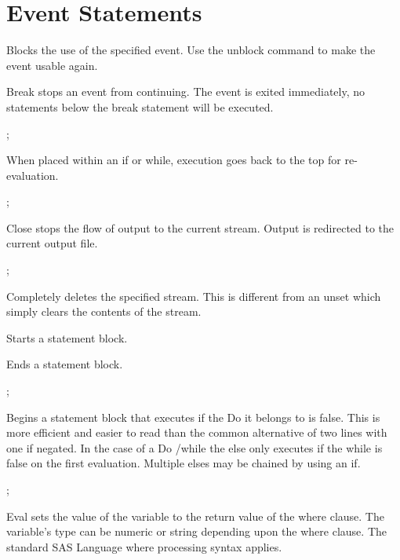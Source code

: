\section{Event Statements}
\begin{description}


Blocks the use of the specified event.  Use the unblock command to
make the event usable again.


Break stops an event from continuing. The event is exited immediately, no statements below
the break statement will be executed.

;

When placed within an if or while, execution goes back to the top for re-evaluation.

;

Close stops the flow of output to the current stream. 
Output is redirected to the current output file.

;

Completely deletes the specified stream.  This is different from an unset which
simply clears the contents of the stream.


Starts a statement block. 


Ends a statement block. 

;

Begins a statement block that executes if the Do it belongs to is false. This is more efficient and easier to read than the common alternative of two lines with one if negated. In the case of a Do /while the else only executes if the while is false on the first evaluation. Multiple elses may be chained by using an if.

;

Eval sets the value of the variable to the return value of the where clause. The variable's type can be numeric or string depending upon the where clause. The standard SAS Language where processing syntax applies. 


\end{description}
